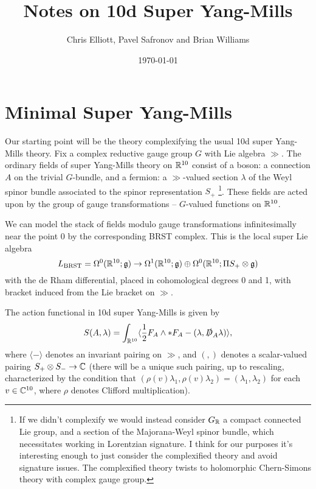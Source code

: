 \documentclass[10pt, oneside]{article}
\title{Notes on 10d Super Yang-Mills}
\author{Chris Elliott, Pavel Safronov and Brian Williams}
\date{\today}
\begin{document}
\maketitle

\section{Minimal Super Yang-Mills}
Our starting point will be the theory complexifying the usual 10d super Yang-Mills theory.  Fix a complex reductive gauge group $G$ with Lie algebra $\gg$.  The ordinary fields of super Yang-Mills theory on $\mathbb{R}^{10}$ consist of a boson: a connection $A$ on the trivial $G$-bundle, and a fermion: a $\gg$-valued section $\lambda$ of the Weyl spinor bundle associated to the spinor representation $S_+$ \footnote{If we didn't complexify we would instead consider $G_{\mathbb{R}}$ a compact connected Lie group, and a section of the Majorana-Weyl spinor bundle, which necessitates working in Lorentzian signature.  I think for our purposes it's interesting enough to just consider the complexified theory and avoid signature issues.  The complexified theory twists to holomorphic Chern-Simons theory with complex gauge group.}.  These fields are acted upon by the group of gauge transformations -- $G$-valued functions on $\mathbb{R}^{10}$.

We can model the stack of fields modulo gauge transformations infinitesimally near the point $0$ by the corresponding BRST complex.  This is the local super Lie algebra
\[L_{\mathrm{BRST}} = \Omega^0(\mathbb{R}^{10}; \mathfrak{g}) \to \Omega^1(\mathbb{R}^{10}; \mathfrak{g}) \oplus \Omega^0(\mathbb{R}^{10}; \Pi S_+ \otimes \mathfrak{g})\]
with the de Rham differential, placed in cohomological degrees 0 and 1, with bracket induced from the Lie bracket on $\gg$.

The action functional in 10d super Yang-Mills is given by
\[S(A,\lambda) = \int_{\mathbb{R}^{10}} \langle \frac{1}{2} F_A \wedge \ast F_A - (\lambda, \slashed{D}_A \lambda)\rangle,\]
where $\langle - \rangle$ denotes an invariant pairing on $\gg$, and $(,)$ denotes a scalar-valued pairing $S_+ \otimes S_- \to \mathbb{C}$ (there will be a unique such pairing, up to rescaling, characterized by the condition that $(\rho(v)\lambda_1,\rho(v)\lambda_2) = (\lambda_1,\lambda_2)$ for each $v \in \mathbb{C}^{10}$, where $\rho$ denotes Clifford multiplication).
\end{document}
